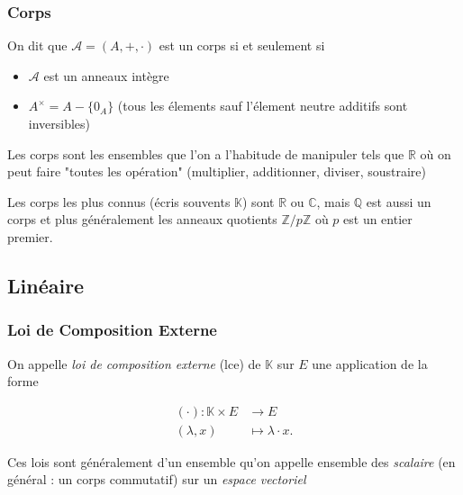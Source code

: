 \documentclass[11pt,colorlinks]{book}
\theoremstyle{mytheoremstyle}
\theoremstyle{mytheoremstyle}
\theoremstyle{mytheoremstyle}
\theoremstyle{mytheoremstyle}
\theoremstyle{mytheoremstyle}
\theoremstyle{mytheoremstyle}
\theoremstyle{mytheoremstyle}
\theoremstyle{mytheoremstyle}
\theoremstyle{myproblemstyle}
\def\mbb#1{\mathbb{#1}}
\def\bC{\mbb{C}}
\def\bR{\mbb{R}}
\def\bQ{\mbb{Q}}
\def\bZ{\mbb{Z}}
\def\bK{\mbb{K}}
\newcommand{\vfunc}[5]{
  \begin{align*}
    #1 \colon #2 &\to #3\\
    #4 &\mapsto #5.
  \end{align*}
}
\begin{document}
\subsubsection{Corps}
\begin{definition}
  On dit que $\mathcal A = (A,+,\cdot)$ est un corps si et seulement si 
  \begin{itemize}
    \item $\mathcal A$ est un anneaux intègre 
    \item $A^{\times} = A - \{0_A\}$ (tous les élements sauf l'élement neutre additifs sont inversibles)
  \end{itemize}
\end{definition}
\begin{rmq}
  Les corps sont les ensembles que l'on a l'habitude de manipuler tels que $\bR$ où on peut faire "toutes les opération" (multiplier, additionner, diviser, soustraire)
\end{rmq}
\begin{ex}
  Les corps les plus connus (écris souvents $\bK$) sont $\bR$ ou $\bC$, mais $\bQ$ est aussi un corps et plus généralement les anneaux 
  quotients $\bZ/p\bZ$ où $p$ est un entier premier.
\end{ex}
\subsection{Linéaire}
\subsubsection{Loi de Composition Externe}
\begin{definition}
  On appelle \textit{loi de composition externe} (lce) de $\bK$ sur $E$ une application de la forme 
  \vfunc{(\cdot)}{\bK \times E}{E}{(\lambda,x)}{\lambda \cdot x}
\end{definition}
\begin{rmq}
  Ces lois sont généralement d'un ensemble qu'on appelle ensemble des \textit{scalaire} (en général : un corps commutatif)
  sur un \textit{espace vectoriel}
\end{rmq}
\end{document}
